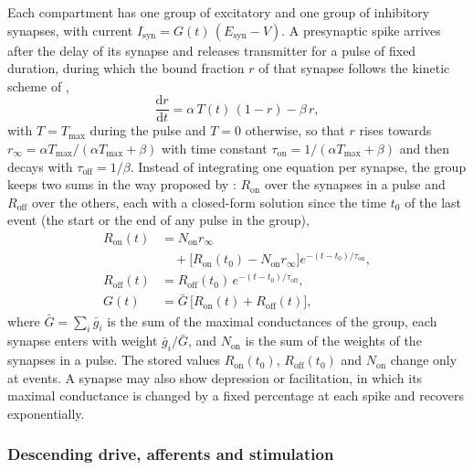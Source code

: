 \documentclass[pdflatex,sn-apa,iicol]{sn-jnl}
\providecommand{\dd}{\mathrm{d}}
\begin{document}
Each compartment has one group of excitatory and one group of inhibitory synapses, with current $I_{\mathrm{syn}} = G(t)\,(E_{\mathrm{syn}} - V)$. A presynaptic spike arrives after the delay of its synapse and releases transmitter for a pulse of fixed duration, during which the bound fraction $r$ of that synapse follows the kinetic scheme of \citet{Destexhe1994},
\begin{equation}
\frac{\dd r}{\dd t} = \alpha\, T(t)\,(1 - r) - \beta\, r , \label{eq:kinetics}
\end{equation}
with $T = T_{\max}$ during the pulse and $T = 0$ otherwise, so that $r$ rises towards $r_\infty = \alpha T_{\max} / (\alpha T_{\max} + \beta)$ with time constant $\tau_{\mathrm{on}} = 1 / (\alpha T_{\max} + \beta)$ and then decays with $\tau_{\mathrm{off}} = 1/\beta$. Instead of integrating one equation per synapse, the group keeps two sums in the way proposed by \citet{Lytton1996}: $R_{\mathrm{on}}$ over the synapses in a pulse and $R_{\mathrm{off}}$ over the others, each with a closed-form solution since the time $t_0$ of the last event (the start or the end of any pulse in the group),
\begin{align}
R_{\mathrm{on}}(t) &= N_{\mathrm{on}} r_\infty \nonumber\\
 &\quad + \bigl[ R_{\mathrm{on}}(t_0) - N_{\mathrm{on}} r_\infty \bigr] e^{-(t - t_0)/\tau_{\mathrm{on}}}, \label{eq:ron}\\
R_{\mathrm{off}}(t) &= R_{\mathrm{off}}(t_0)\, e^{-(t - t_0)/\tau_{\mathrm{off}}}, \label{eq:roff}\\
G(t) &= \bar G\, \bigl[ R_{\mathrm{on}}(t) + R_{\mathrm{off}}(t) \bigr], \label{eq:gsyn}
\end{align}
where $\bar G = \sum_i \bar g_i$ is the sum of the maximal conductances of the group, each synapse enters with weight $\bar g_i / \bar G$, and $N_{\mathrm{on}}$ is the sum of the weights of the synapses in a pulse. The stored values $R_{\mathrm{on}}(t_0)$, $R_{\mathrm{off}}(t_0)$ and $N_{\mathrm{on}}$ change only at events. A synapse may also show depression or facilitation, in which its maximal conductance is changed by a fixed percentage at each spike and recovers exponentially.

\subsubsection{Descending drive, afferents and stimulation}\label{sec:drive}
\end{document}
